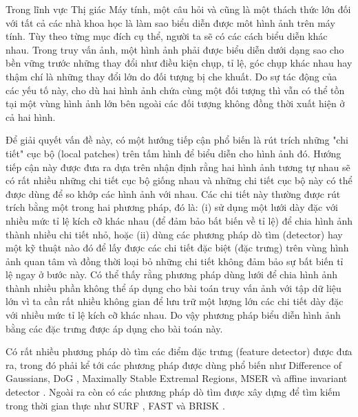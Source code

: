 Trong lĩnh vực Thị giác Máy tính, một câu hỏi và cũng là một thách thức lớn đối với tất cả các nhà khoa học là làm sao biểu diễn được môt hình ảnh trên máy tính. Tùy theo từng mục đích cụ thể, người ta sẽ có các cách biểu diễn khác nhau. Trong truy vấn ảnh, một hình ảnh phải được biểu diễn dưới dạng sao cho bền vững trước những thay đổi như điều kiện chụp, tỉ lệ, góc chụp khác nhau hay thậm chí là những thay đổi lớn do đối tượng bị che khuất. Do sự tác động của các yếu tố này, cho dù hai hình ảnh chứa cùng một đối tượng thì vẫn có thể tồn tại một vùng hình ảnh lớn bên ngoài các đối tượng không đồng thời xuất hiện ở cả hai hình.

Để giải quyết vấn đề này, có một hướng tiếp cận phổ biến là rút trích những "chi tiết" cục bộ (local patches) trên tấm hình để biểu diễn cho hình ảnh đó. Hướng tiếp cận này được đưa ra dựa trên nhận định rằng hai hình ảnh tương tự nhau sẽ có rất nhiều những chi tiết cục bộ giống nhau và những chi tiết cục bộ này có thể được dùng để so khớp các hình ảnh với nhau. Các chi tiết này thường được rút trích bằng một trong hai phương pháp, đó là: (i) sử dụng một lưới dày đặc với nhiều mức tỉ lệ kích cỡ khác nhau (để đảm bảo bất biến về tỉ lệ) để chia hình ảnh thành nhiều chi tiết nhỏ, hoặc (ii) dùng các phương pháp dò tìm (detector) hay một kỹ thuật nào đó để lấy được các chi tiết đặc biệt (đặc trưng) trên vùng hình ảnh quan tâm và đồng thời loại bỏ những chi tiết không đảm bảo sự bất biến tỉ lệ ngay ở bước này. Có thể thấy rằng phương pháp dùng lưới để chia hình ảnh thành nhiều phần không thể áp dụng cho bài toán truy vấn ảnh với tập dữ liệu lớn vì ta cần rất nhiều không gian để lưu trữ một lượng lớn các chi tiết dày đặc với nhiều mức tỉ lệ kích cỡ khác nhau. Do vậy phương pháp biểu diễn hình ảnh bằng các đặc trưng được áp dụng cho bài toán này.

Có rất nhiều phương pháp dò tìm các điểm đặc trưng (feature detector) được đưa ra, trong đó phải kể tới các phương pháp được dùng phổ biến như Difference of Gaussians, DoG \cite{lowe2004distinctive}, Maximally Stable Extremal Regions, MSER \cite{matas2004robust} và affine invariant detector \cite{mikolajczyk2004scale}. Ngoài ra còn có các phương pháp dò tìm được xây dựng để tìm kiếm trong thời gian thực như SURF \cite{bay2006surf}, FAST \cite{rosten2010faster} và BRISK \cite{leutenegger2011brisk}.

